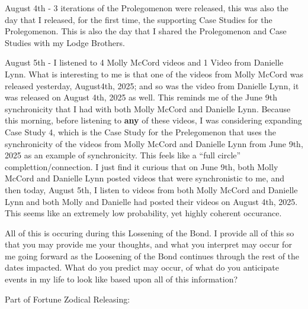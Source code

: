 \documentclass{article}
\begin{document}
August 4th - 3 iterations of the Prolegomenon were released, this was also the day that I released, for the first time, the supporting Case Studies for the Prolegomenon. This is also the day that I shared the Prolegomenon and Case Studies with my Lodge Brothers.

August 5th - I listened to 4 Molly McCord videos and 1 Video from Danielle Lynn. What is interesting to me is that one of the videos from Molly McCord was released yesterday, August4th, 2025; and so was the video from Danielle Lynn, it was released on August 4th, 2025 as well. This reminds me of the June 9th synchronicity that I had with both Molly McCord and Danielle Lynn. Because this morning, before listening to \textbf{any} of these videos, I was considering expanding Case Study 4, which is the Case Study for the Prelegomenon that uses the synchronicity of the videos from Molly McCord and Danielle Lynn from June 9th, 2025 as an example of synchronicity. This feels like a ``full circle'' complettion/connection. I just find it curious that on June 9th, both Molly McCord and Danielle Lynn posted videos that were synchronistic to me, and then today, August 5th, I listen to videos from both Molly McCord and Danielle Lynn and both Molly and Danielle had posted their videos on August 4th, 2025. This seems like an extremely low probability, yet highly coherent occurance.

All of this is occuring during this Lossening of the Bond. I provide all of this so that you may provide me your thoughts, and what you interpret may occur for me going forward as the Loosening of the Bond continues through the rest of the dates impacted. What do you predict may occur, of what do you anticipate events in my life to look like based upon all of this information?

Part of Fortune Zodical Releasing:
\end{document}
